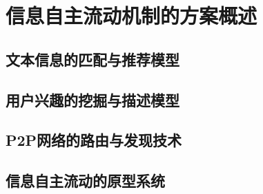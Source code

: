 \section{信息自主流动机制的方案概述}

\subsection{文本信息的匹配与推荐模型}

\subsection{用户兴趣的挖掘与描述模型}

\subsection{P2P网络的路由与发现技术}

\subsection{信息自主流动的原型系统}

